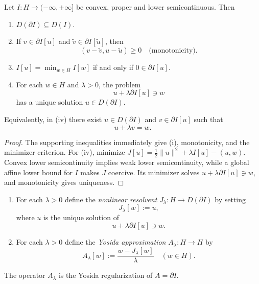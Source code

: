 \begin{theorem}
\label{thm:properties-of-subdifferentials}

Let $I : H \to (-\infty, +\infty]$ be convex, proper and lower semicontinuous. Then
\begin{enumerate}
\item[(i)] $D(\partial I) \subseteq D(I)$.
\item[(ii)] If $v \in \partial I[u]$ and $\tilde{v} \in \partial I[\tilde{u}]$, then
\[
(v - \tilde{v}, u - \tilde{u}) \geq 0 \quad \text{(monotonicity)}.
\]
\item[(iii)] $I[u] = \min_{w \in H} I[w]$ if and only if $0 \in \partial I[u]$.
\item[(iv)] For each $w \in H$ and $\lambda > 0$, the problem
\[
u + \lambda \partial I[u] \ni w
\]
has a unique solution $u \in D(\partial I)$.
\end{enumerate}
Equivalently, in (iv) there exist $u\in D(\partial I)$ and $v\in\partial I[u]$ such that
\[
u + \lambda v = w.
\]
\end{theorem}

\begin{proof}
\sketch The supporting inequalities immediately give (i), monotonicity, and the minimizer criterion. For (iv), minimize $J[u]=\frac12\|u\|^2+\lambda I[u]-(u,w)$. Convex lower semicontinuity implies weak lower semicontinuity, while a global affine lower bound for $I$ makes $J$ coercive. Its minimizer solves $u+\lambda\partial I[u]\ni w$, and monotonicity gives uniqueness.
\end{proof}

\begin{definition}
\label{def:nonlinear-resolvent-yosida}

\begin{enumerate}
\item[(1)] For each $\lambda > 0$ define the \textit{nonlinear resolvent} $J_\lambda : H \to D(\partial I)$ by setting
\[
J_\lambda[w] := u,
\]
where $u$ is the unique solution of
\[
u + \lambda \partial I[u] \ni w.
\]
\item[(2)] For each $\lambda > 0$ define the \textit{Yosida approximation} $A_\lambda : H \to H$ by
\[
A_\lambda[w] := \frac{w - J_\lambda[w]}{\lambda} \quad (w \in H).
\tag{7}
\]
\end{enumerate}
The operator $A_\lambda$ is the Yosida regularization of $A=\partial I$.
\end{definition}

